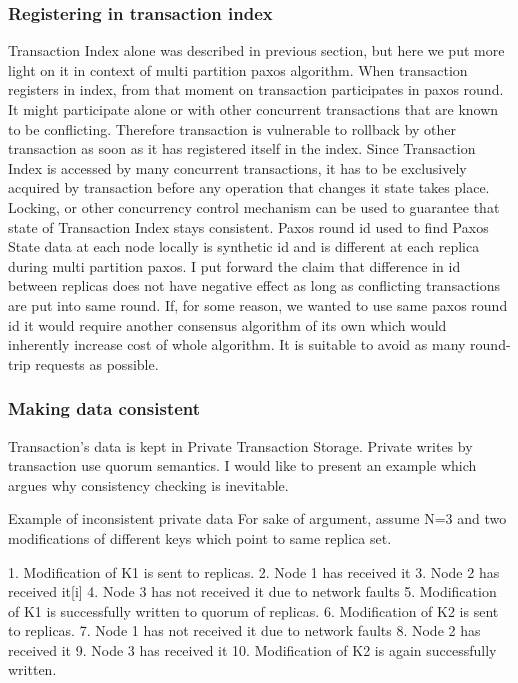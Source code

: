 \subsubsection{Registering in transaction index}
Transaction Index alone was described in previous section, but here we put more light on it in context of multi partition paxos algorithm. When transaction registers in index, from that moment on transaction participates in paxos round. It might participate alone or with other concurrent transactions that are known to be conflicting. Therefore transaction is vulnerable to rollback by other transaction as soon as it has registered itself in the index.
        Since Transaction Index is accessed by many concurrent transactions, it has to be exclusively acquired by transaction before any operation that changes it state takes place. Locking, or other concurrency control mechanism can be used to guarantee that state of Transaction Index stays consistent.
        Paxos round id used to find Paxos State data at each node locally is synthetic id and is different at each replica during multi partition paxos. I put forward the claim that difference in id between replicas does not have negative effect as long as conflicting transactions are put into same round. If, for some reason, we wanted to use same paxos round id it would require another consensus algorithm of its own which would inherently increase cost of whole algorithm. It is suitable to avoid as many round-trip requests as possible.
        
\subsubsection{Making data consistent}
Transaction’s data is kept in Private Transaction Storage. Private writes by transaction use quorum semantics. I would like to present an example which argues why consistency checking is inevitable.


Example of inconsistent private data
For sake of argument, assume N=3 and two modifications of different keys which point to same replica set.


1. Modification of K1 is sent to replicas.
2. Node 1 has received it
3. Node 2 has received it[i]
4. Node 3 has not received it due to network faults
5. Modification of K1 is successfully written to quorum of replicas.
6. Modification of K2 is sent to replicas.
7. Node 1 has not received it due to network faults
8. Node 2 has received it
9. Node 3 has received it
10. Modification of K2 is again successfully written.


